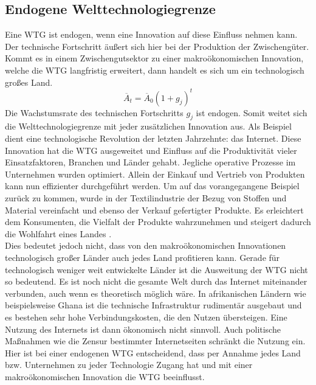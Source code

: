 \subsection{Endogene Welttechnologiegrenze} \label{sec:endogene WTG}
Eine WTG ist endogen, wenn eine Innovation auf diese Einfluss nehmen kann. Der technische Fortschritt äu{\ss}ert sich hier bei der Produktion der Zwischengüter. Kommt es in einem Zwischengutsektor zu einer makroökonomischen Innovation, welche die WTG langfristig erweitert, dann handelt es sich um ein technologisch gro{\ss}es Land.
\begin{equation}\overline{A}_t=\overline{A}_0(1+g_j)^t\end{equation}
Die Wachstumsrate des technischen Fortschritts $g_j$ ist endogen. Somit weitet sich die Welttechnologiegrenze mit jeder zusätzlichen Innovation aus. Als Beispiel dient eine technologische Revolution der letzten Jahrzehnte: das Internet. Diese Innovation hat die WTG ausgeweitet und Einfluss auf die Produktivität vieler Einsatzfaktoren, Branchen und Länder gehabt. Jegliche operative Prozesse im Unternehmen wurden optimiert. Allein der Einkauf und Vertrieb von Produkten kann nun effizienter durchgeführt werden. Um auf das vorangegangene Beispiel zurück zu kommen, wurde in der Textilindustrie der Bezug von Stoffen und Material vereinfacht und ebenso der Verkauf gefertigter Produkte. Es erleichtert dem Konsumenten, die Vielfalt der Produkte wahrzunehmen und steigert dadurch  die Wohlfahrt eines Landes \citep{Krugman.79}.\\


Dies bedeutet jedoch nicht, dass von den makroökonomischen Innovationen technologisch gro{\ss}er Länder auch jedes Land profitieren kann. Gerade für technologisch weniger weit entwickelte Länder ist die Ausweitung der WTG nicht so bedeutend. Es ist noch nicht die gesamte Welt durch das Internet miteinander verbunden, auch wenn es theoretisch möglich wäre. In afrikanischen Ländern wie beispielsweise Ghana ist die technische Infrastruktur rudimentär ausgebaut und es bestehen sehr hohe Verbindungskosten, die den Nutzen übersteigen. Eine Nutzung des Internets ist dann ökonomisch nicht sinnvoll. Auch politische Ma{\ss}nahmen wie die Zensur bestimmter Internetseiten schränkt die Nutzung ein.\\


Hier ist bei einer endogenen WTG entscheidend, dass per Annahme jedes Land bzw. Unternehmen zu jeder Technologie Zugang hat und mit einer makroökonomischen Innovation die WTG beeinflusst.



